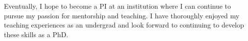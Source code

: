 \documentclass[12pt]{article}
\begin{document}
Eventually, I hope to become a PI 
at an institution where I can continue to pursue my passion 
for mentorship and teaching.
I have thoroughly enjoyed my teaching experiences as an undergrad 
and look forward to continuing to develop these skills as a PhD.




\end{document}
